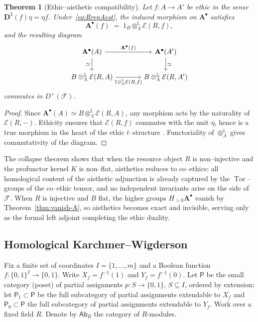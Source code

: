 \documentclass[12pt]{article}
\DeclareMathOperator{\Tor}{Tor}
\newcommand{\E}{\mathcal{E}}
\newcommand{\F}{\mathcal{F}}
\newcommand{\Ab}{\mathsf{Ab}}
\theoremstyle{plain}
\newtheorem{theorem}{Theorem}[section]
\theoremstyle{definition}
\theoremstyle{remark}
\numberwithin{equation}{section}
\begin{document}
\begin{theorem}[Ethic–aisthetic compatibility]\label{thm:compat-A}
Let $f:A\to A'$ be ethic in the sense $\mathbf D^2(f)\eta=\eta f$.  
Under~\eqref{eq:RrepAest}, the induced morphism on $\mathbf A^\bullet$ satisfies
\[
\mathbf A^\bullet(f)\;=\;1_B\otimes^{\mathbb L}_\Lambda\E(R,f),
\]
and the resulting diagram
\[
\begin{tikzcd}[column sep=large]
{\mathbf{A}^\bullet(A)} \arrow[r, "{\mathbf{A}^\bullet(f)}"] \arrow[d, "\simeq"']
& {\mathbf{A}^\bullet(A')} \arrow[d, "\simeq"] \\
{B \otimes^{\mathbb{L}}_{\Lambda} \mathcal{E}(R,A)} \arrow[r, "{1 \otimes^{\mathbb{L}}_{\Lambda} \mathcal{E}(R,f)}"']
& {B \otimes^{\mathbb{L}}_{\Lambda} \mathcal{E}(R,A')}
\end{tikzcd}
\]
commutes in $D^+(\F)$.
\end{theorem}

\begin{proof}
Since $\mathbf A^\bullet(A)\simeq B\otimes^{\mathbb L}_\Lambda\E(R,A)$, any morphism acts by the naturality of $\E(R,-)$.  
Ethicity ensures that $\E(R,f)$ commutes with the unit $\eta$, hence is a true morphism in the heart of the ethic $t$–structure \cite{MacLane1998}.  
Functoriality of $\otimes^{\mathbb L}_\Lambda$ gives commutativity of the diagram.
\end{proof}

The collapse theorem shows that when the resource object $R$ is non–injective and the profunctor kernel $K$ is non–flat, aisthetics reduces to co–ethics: all homological content of the aisthetic adjunction is already captured by the $\Tor$–groups of the co–ethic tensor, and no independent invariants arise on the side of $\F$.  
When $R$ is injective and $B$ flat, the higher groups $H_{>0}\mathbf A^\bullet$ vanish by Theorem~\ref{thm:vanish-A}, so aisthetics becomes exact and invisible, serving only as the formal left adjoint completing the ethic duality.

\subsection{Homological Karchmer--Wigderson}\label{subsec:HKW-core}

Fix a finite set of coordinates $I=\{1,\dots,m\}$ and a Boolean function $f:\{0,1\}^I\to\{0,1\}$. Write $X_f=f^{-1}(1)$ and $Y_f=f^{-1}(0)$. Let $\mathsf P$ be the small category (poset) of partial assignments $p:S\to\{0,1\}$, $S\subseteq I$, ordered by extension; let $\mathsf P_1\subset\mathsf P$ be the full subcategory of partial assignments extendable to $X_f$ and $\mathsf P_0\subset\mathsf P$ the full subcategory of partial assignments extendable to $Y_f$. Work over a fixed field $R$. Denote by $\Ab_R$ the category of $R$-modules.
\end{document}
